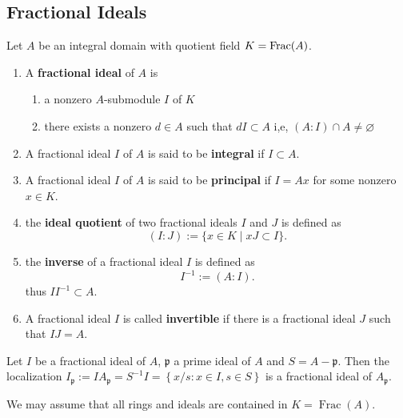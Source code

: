 \documentclass[12pt, oneside]{book}
\begin{document}
\subsection{Fractional Ideals}
\begin{definition}
    Let $A$ be an integral domain with quotient field $K=\operatorname{Frac}(A)$.
    \begin{enumerate}
        \item
              A \textbf{fractional ideal} of $A$ is
              \begin{enumerate}[label=(\roman*)]
                  \item a nonzero $A$-submodule $I$ of $K$
                  \item there exists a nonzero $d \in A$ such that $d I \subset A$ i,e, $\left(A:I\right)\cap A \neq \varnothing$
              \end{enumerate}
        \item
              A fractional ideal $I$ of $A$ is said to be \textbf{integral} if $I \subset A$.
        \item
              A fractional ideal $I$ of $A$ is said to be \textbf{principal} if $I=Ax$ for some nonzero $x \in K$.
        \item
              the \textbf{ideal quotient} of two fractional ideals $I$ and $J$ is defined as
              \begin{equation*}
                  (I: J)
                  :=
                  \{x \in K \mid x J \subset I\} .
              \end{equation*}
        \item
              the \textbf{inverse} of a fractional ideal $I$ is defined as
              \begin{equation*}
                  I^{-1}
                  :=
                  (A: I) .
              \end{equation*}
              thus $II^{-1} \subset A$.
        \item
              A fractional ideal $I$ is called \textbf{invertible} if there is a fractional ideal $J$ such that $I J=A$.
    \end{enumerate}
    \begin{remark}
        Let $I$ be a fractional ideal of $A$, $\mathfrak{p}$ a prime ideal of $A$ and $S=A-\mathfrak{p}$.
        Then the localization $I_{\mathfrak{p}}:=IA_{\mathfrak{p}}=S^{-1} I=\left\{x/s:x\in I,s\in S\right\}$ is a fractional ideal of $A_{\mathfrak{p}}$.

        We may assume that all rings and ideals are contained in $K=\operatorname{Frac}(A)$.
    \end{remark}
\end{definition}
\end{document}
